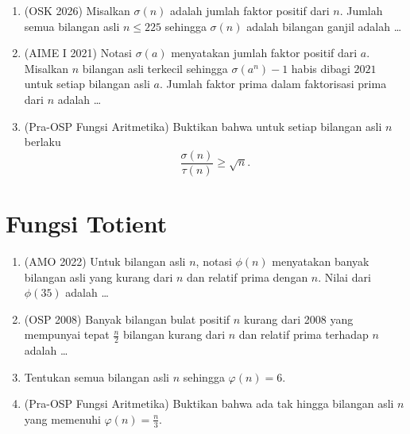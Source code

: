 \documentclass[12pt]{scrartcl}
\begin{document}
\begin{enumerate}[resume]
	\item (OSK 2026)
	Misalkan $\sigma(n)$ adalah jumlah faktor positif dari $n$.
	Jumlah semua bilangan asli $n \le 225$ sehingga $\sigma(n)$ adalah
	bilangan ganjil adalah \dots

	\item (AIME I 2021)
	Notasi $\sigma(a)$ menyatakan jumlah faktor positif dari $a$.
	Misalkan $n$ bilangan asli terkecil sehingga $\sigma(a^{n}) - 1$
	habis dibagi $2021$ untuk setiap bilangan asli $a$.
	Jumlah faktor prima dalam faktorisasi prima dari $n$ adalah \dots

	\item (Pra-OSP Fungsi Aritmetika)
	Buktikan bahwa untuk setiap bilangan asli $n$ berlaku
	\[ \frac{\sigma(n)}{\tau(n)} \ge \sqrt{n}. \]

\end{enumerate}

\section{Fungsi Totient}

\begin{enumerate}[resume]

	\item (AMO 2022)
	Untuk bilangan asli $n$, notasi $\phi(n)$ menyatakan banyak bilangan asli
	yang kurang dari $n$ dan relatif prima dengan $n$.
	Nilai dari $\phi(35)$ adalah \dots

	\item (OSP 2008)
	Banyak bilangan bulat positif $n$ kurang dari 2008 yang mempunyai tepat
	$\frac{n}{2}$ bilangan kurang dari $n$ dan relatif prima terhadap $n$
	adalah \dots

	\item
	Tentukan semua bilangan asli $n$ sehingga $\varphi(n) = 6$.

	\item (Pra-OSP Fungsi Aritmetika)
	Buktikan bahwa ada tak hingga bilangan asli $n$ yang memenuhi
	$\varphi(n) = \frac{n}{3}$.

\end{enumerate}
\end{document}
